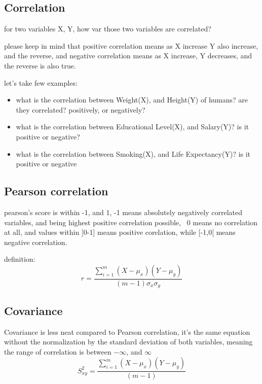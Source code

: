 \documentclass[4apaper,12pt]{book}
\begin{document}
\begin{description}
      \section{Correlation}
      \begin{description}
      \item for two variables X, Y, how var those two variables are correlated?
      \item please keep in mind that positive correlation means as X increase Y also increase, and the reverse, and negative correlation means as X increase, Y decreases, and the reverse is also true.
      \item let's take few examples:
        \begin{itemize}
        \item what is the correlation between Weight(X), and Height(Y) of humans? are they correlated? positively, or negatively?
        \item what is the correlation between Educational Level(X), and Salary(Y)? is it positive or negative?
        \item what is the correlation between Smoking(X), and Life Expectancy(Y)? is it positive or negative
        \end{itemize}
        \subsection{Pearson correlation}
      \item pearson's score is within -1, and 1, -1 means absolutely negatively correlated variables, and being highest positive correlation possible, ~0 means no correlation at all, and values within ]0-1] means positive corelation, while [-1,0[ means negative correlation.
            \item definition:
              \begin{equation} r = \frac{\sum_{i=1}^{m}(X-\mu_{x})(Y-\mu_{y})}{(m-1)\sigma_x\sigma_y} \end{equation}
              \end{description}
      \subsection{Covariance}
    \item Covariance is less neat compared to Pearson correlation, it's the same equation without the normalization by the standard deviation of both variables, meaning the range of correlation is between $-\infty$, and $\infty$
      \begin{equation} S_{xy}^2 = \frac{\sum_{i=1}^{m}(X-\mu_{x})(Y-\mu_{y})}{(m-1)} \end{equation}
  \end{description}
\end{document}
